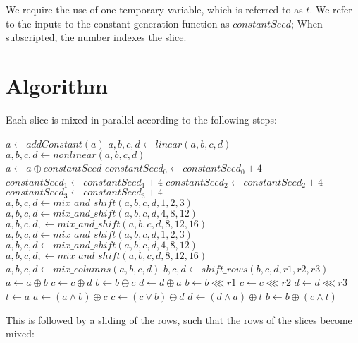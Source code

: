 \documentclass[preprint]{iacrtrans}
\begin{document}
We require the use of one temporary variable, which is referred to as $t$. We refer to the inputs to the constant generation function as $constantSeed$; When subscripted, the number indexes the slice.

\section{Algorithm}
Each slice is mixed in parallel according to the following steps:

\begin{algorithmic}
	\State $a \gets addConstant(a)$
	\State $a, b, c, d \gets linear(a, b, c, d)$
	\State $a, b, c, d \gets nonlinear(a, b, c, d)$
\EndFunction\\
	\State $a \gets a \oplus constantSeed$
	\State $constantSeed_0 \gets constantSeed_0 + 4$
	\State $constantSeed_1 \gets constantSeed_1 + 4$
	\State $constantSeed_2 \gets constantSeed_2 + 4$
	\State $constantSeed_3\gets constantSeed_3 + 4$
\EndFunction\\
	\State $a, b, c, d \gets mix\_and\_shift(a, b, c, d, 1, 2, 3)$
	\State $a, b, c, d \gets mix\_and\_shift(a, b, c, d, 4, 8, 12)$
	\State $a, b, c, d, \gets mix\_and\_shift(a, b, c, d, 8, 12, 16)$
	\State $a, b, c, d \gets mix\_and\_shift(a, b, c, d, 1, 2, 3)$
	\State $a, b, c, d \gets mix\_and\_shift(a, b, c, d, 4, 8, 12)$
	\State $a, b, c, d, \gets mix\_and\_shift(a, b, c, d, 8, 12, 16)$	
\EndFunction
{}
	\State $a, b, c, d \gets mix\_columns(a, b, c, d)$
	\State$b, c, d \gets shift\_rows(b, c, d, r1, r2, r3)$
\EndFunction
{}
	\State $a \gets a \oplus b$
	\State $c \gets c \oplus d$
	\State $b \gets b \oplus c$
	\State $d \gets d \oplus a$
\EndFunction
{}
	\State $b \gets b \lll r1$
	\State $c \gets c \lll r2$
	\State $d \gets d \lll r3$
\EndFunction\\
	\State $t \gets a$
	\State $a \gets (a \land b) \oplus c$
	\State $c \gets (c \lor b) \oplus d$
	\State $d \gets (d \land a) \oplus t$
	\State $b \gets b \oplus (c \land t)$
\EndFunction\\
\end{algorithmic}

This is followed by a sliding of the rows, such that the rows of the slices become mixed:
\end{document}
